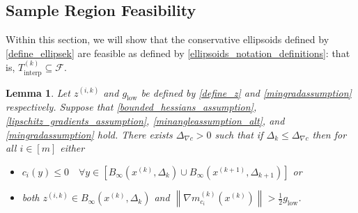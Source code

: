 \documentclass{article}
\newtheorem{lemma}[theorem]{Lemma}
\theoremstyle{case}
\numberwithin{theorem}{subsection}
\newcommand{\dk}{\Delta_k}
\newcommand{\dkpo}{\Delta_{k+1}}
\newcommand{\feasible}{{\mathcal F}}
\newcommand{\gmcik}{{\nabla m_{c_i}^{(k)}\left(\xk\right)}}
\newcommand{\mingraddelta}{{\Delta_{\nabla c}}}
\newcommand{\mingrad}{{ g_{\textrm{low}} }}
\newcommand{\sampletrk}{{T_{\text{interp}}^{(k)}}}
\newcommand{\tr}{{ B_{\infty}\left(\xk, \dk\right) }}
\newcommand{\trkpo}{{ B_{\infty}\left(\xkpo, \dkpo\right) }}
\newcommand{\xkpo}{{{x}^{(k+1)}}}
\newcommand{\xk}{x^{(k)}}
\newcommand{\zik}{{z^{(i, k)}}}
\newcommand{\fik}{{C^{(i, k)}}}
\begin{document}
\subsection{Sample Region Feasibility}
\label{ellipsoid_is_feasible_section}

Within this section, we will show that the conservative ellipsoids defined by \cref{define_ellipsek} are feasible as defined by \cref{ellipsoids_notation_definitions}:
that is, $\sampletrk \subseteq \feasible$.

\begin{lemma}
\label{only_small_z_matters}
Let $\zik$ and $\mingrad$ be defined by \cref{define_z} and \cref{mingradassumption} respectively.
Suppose that 
\cref{bounded_hessians_assumption},
\cref{lipschitz_gradients_assumption},
\cref{minangleassumption_alt},
and \cref{mingradassumption} hold.
There exists $\mingraddelta > 0$ such that if $\dk \le \mingraddelta$ then for all $i \in [m]$ either
\begin{itemize}
\item $c_i(y) \le 0 \quad \forall y \in \left[\tr \cup \trkpo\right]$ or
\item both $\zik \in \tr$ and $\left\|\gmcik\right\| > \frac 1 2 \mingrad$.
\end{itemize}
\end{lemma}
\end{document}

